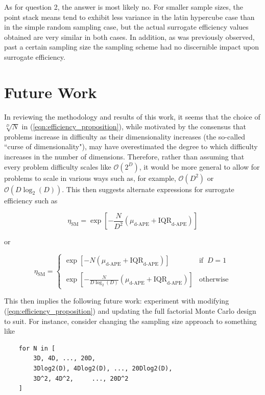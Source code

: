 \documentclass[conference]{IEEEtran}
\begin{document}
As for question 2, the answer is most likely no. For smaller sample sizes, the point stack means tend to exhibit less variance in the latin hypercube case than in the simple random sampling case, but the actual surrogate efficiency values obtained are very similar in both cases. In addition, as was previously observed, past a certain sampling size the sampling scheme had no discernible impact upon surrogate efficiency.

\section{Future Work}

In reviewing the methodology and results of this work, it seems that the choice of $\sqrt[D]{N}$ in (\ref{eqn:efficiency_proposition}), while motivated by the consensus that problems increase in difficulty as their dimensionality increases (the so-called ``curse of dimensionality"), may have overestimated the degree to which difficulty increases in the number of dimensions. Therefore, rather than assuming that every problem difficulty scales like $\mathcal{O}(2^D)$, it would be more general to allow for problems to scale in various ways such as, for example, $\mathcal{O}(D^2)$ or $\mathcal{O}(D\log_2(D))$. This then suggests alternate expressions for surrogate efficiency such as 

\newpage
\begin{equation}
	\eta_\textrm{SM} = \exp\left[-\frac{N}{D^2}\left(\mu_\textrm{d-APE} + \textrm{IQR}_\textrm{d-APE}\right)\right]
	\label{eqn:efficiency_proposition_2}
\end{equation}

\noindent or

\begin{equation}
	\eta_\textrm{SM} = \begin{cases}
		\exp\left[-N\left(\mu_\textrm{d-APE} + \textrm{IQR}_\textrm{d-APE}\right)\right] & \textrm{if}\;\;D=1 \\
		{} & {} \\
		\exp\left[-\frac{N}{D\log_2(D)}\left(\mu_\textrm{d-APE} + \textrm{IQR}_\textrm{d-APE}\right)\right] & \textrm{otherwise}
	\end{cases}
	\label{eqn:efficiency_proposition_3}
\end{equation}

\noindent This then implies the following future work: experiment with modifying (\ref{eqn:efficiency_proposition}) and updating the full factorial Monte Carlo design to suit. For instance, consider changing the sampling size approach to something like

\begin{verbatim}
	for N in [
	    3D, 4D, ..., 20D,
	    3Dlog2(D), 4Dlog2(D), ..., 20Dlog2(D),
	    3D^2, 4D^2, 	..., 20D^2
	]
\end{verbatim}



{}

\end{document}
